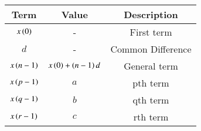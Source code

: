 \begin{tabular}{|c|c|c|}
    \hline
    \textbf{Term} & \textbf{Value} & \textbf{Description}\\
    \hline
    $x\left(0\right)$ & - & First term\\
    \hline
    $d$ & - & Common Difference\\
    \hline
    $x\left(n-1\right)$ & $x\left(0\right)+\left(n-1\right)d$ & General term\\
    \hline
    $x\left(p-1\right)$ & $a$ & pth term\\
    \hline
    $x\left(q-1\right)$ & $b$ & qth term\\
    \hline
    $x\left(r-1\right)$ & $c$ & rth term\\
    \hline
  \end{tabular}
  
